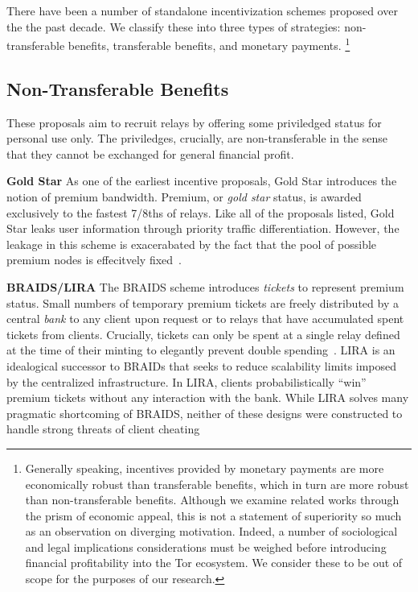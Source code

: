 There have been a number of standalone incentivization schemes proposed over the
the past decade. We classify these into three types of strategies:
non-transferable benefits, transferable benefits, and monetary
payments. \footnote{Generally speaking, incentives provided by monetary payments
  are more economically robust than transferable benefits, which in turn are
  more robust than non-transferable benefits. Although we examine related works
  through the prism of economic appeal, this is not a statement of superiority
  so much as an observation on diverging motivation. Indeed, a number of
  sociological and legal implications considerations must be weighed before
  introducing financial profitability into the Tor ecosystem. We consider these
  to be out of scope for the purposes of our research.}

\subsection{Non-Transferable Benefits}

These proposals aim to recruit relays by offering some priviledged status for
personal use only. The priviledges, crucially, are non-transferable in the sense
that they cannot be exchanged for general financial profit.

\textbf{Gold Star} As one of the earliest incentive proposals, Gold Star
introduces the notion of premium bandwidth. Premium, or \emph{gold star} status,
is awarded exclusively to the fastest 7/8ths of relays. Like all of the
proposals listed, Gold Star leaks user information through priority traffic
differentiation. However, the leakage in this scheme is exacerabated by the fact
that the pool of possible premium nodes is effecitvely
fixed~\cite{dingledine2010building}.

\textbf{BRAIDS/LIRA} The BRAIDS scheme introduces \emph{tickets} to represent
premium status. Small numbers of temporary premium tickets are freely
distributed by a central \emph{bank} to any client upon request or to relays
that have accumulated spent tickets from clients. Crucially, tickets can only be
spent at a single relay defined at the time of their minting to elegantly
prevent double spending~\cite{jansen2010recruiting}. LIRA is an idealogical successor
to BRAIDs that seeks to reduce scalability limits imposed by the centralized
infrastructure. In LIRA, clients probabilistically ``win'' premium tickets
without any interaction with the bank. While LIRA solves many pragmatic
shortcoming of BRAIDS, neither of these designs were constructed to handle
strong threats of client cheating~\cite{jansen2013lira}


